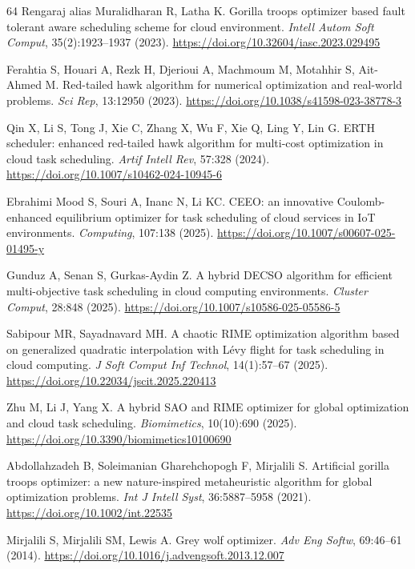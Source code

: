 \documentclass[pdflatex,onecolumn,sn-mathphys-num]{sn-jnl}
\begin{document}
\begin{thebibliography}{64}
Rengaraj alias Muralidharan R, Latha K. Gorilla troops optimizer based fault tolerant aware scheduling scheme for cloud environment. \textit{Intell Autom Soft Comput}, 35(2):1923--1937 (2023). \url{https://doi.org/10.32604/iasc.2023.029495}

Ferahtia S, Houari A, Rezk H, Djerioui A, Machmoum M, Motahhir S, Ait-Ahmed M. Red-tailed hawk algorithm for numerical optimization and real-world problems. \textit{Sci Rep}, 13:12950 (2023). \url{https://doi.org/10.1038/s41598-023-38778-3}

Qin X, Li S, Tong J, Xie C, Zhang X, Wu F, Xie Q, Ling Y, Lin G. ERTH scheduler: enhanced red-tailed hawk algorithm for multi-cost optimization in cloud task scheduling. \textit{Artif Intell Rev}, 57:328 (2024). \url{https://doi.org/10.1007/s10462-024-10945-6}

Ebrahimi Mood S, Souri A, Inanc N, Li KC. CEEO: an innovative Coulomb-enhanced equilibrium optimizer for task scheduling of cloud services in IoT environments. \textit{Computing}, 107:138 (2025). \url{https://doi.org/10.1007/s00607-025-01495-y}

Gunduz A, Senan S, Gurkas-Aydin Z. A hybrid DECSO algorithm for efficient multi-objective task scheduling in cloud computing environments. \textit{Cluster Comput}, 28:848 (2025). \url{https://doi.org/10.1007/s10586-025-05586-5}

Sabipour MR, Sayadnavard MH. A chaotic RIME optimization algorithm based on generalized quadratic interpolation with L\'{e}vy flight for task scheduling in cloud computing. \textit{J Soft Comput Inf Technol}, 14(1):57--67 (2025). \url{https://doi.org/10.22034/jscit.2025.220413}

Zhu M, Li J, Yang X. A hybrid SAO and RIME optimizer for global optimization and cloud task scheduling. \textit{Biomimetics}, 10(10):690 (2025). \url{https://doi.org/10.3390/biomimetics10100690}

Abdollahzadeh B, Soleimanian Gharehchopogh F, Mirjalili S. Artificial gorilla troops optimizer: a new nature-inspired metaheuristic algorithm for global optimization problems. \textit{Int J Intell Syst}, 36:5887--5958 (2021). \url{https://doi.org/10.1002/int.22535}

Mirjalili S, Mirjalili SM, Lewis A. Grey wolf optimizer. \textit{Adv Eng Softw}, 69:46--61 (2014). \url{https://doi.org/10.1016/j.advengsoft.2013.12.007}


\end{thebibliography}
\end{document}
